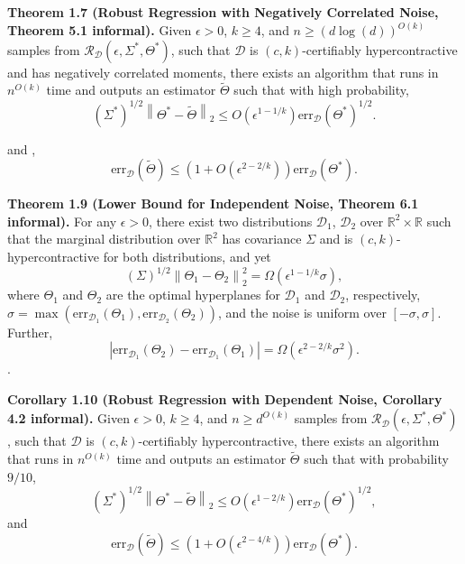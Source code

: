 \documentclass[preprint,11pt]{elsarticle}
\begin{document}
\textbf{Theorem 1.7 (Robust Regression with Negatively Correlated Noise, Theorem 5.1 informal).} 
Given $\epsilon > 0$, $k \geq 4$, and $n \geq (d \log(d))^{O(k)}$ samples from $\mathcal{R}_\mathcal{D}(\epsilon, \Sigma^\ast, \Theta^\ast)$, such that $\mathcal{D}$ is $(c, k)$-certifiably hypercontractive and has negatively correlated moments, there exists an algorithm that runs in $n^{O(k)}$ time and outputs an estimator $\tilde{\Theta}$ such that with high probability,
\[
(\Sigma^\ast)^{1/2} \left\|\Theta^\ast - \tilde{\Theta} \right\|_2 \leq O \left( \epsilon^{1 - 1/k} \right) \text{err}_{\mathcal{D}}(\Theta^\ast)^{1/2}.
\]

and , \\

\[
\text{err}_{\mathcal{D}}(\tilde{\Theta}) \leq \left( 1 + O\left( \epsilon^{2 - 2/k} \right) \right) \text{err}_{\mathcal{D}}(\Theta^\ast).
\]

\textbf{Theorem 1.9 (Lower Bound for Independent Noise, Theorem 6.1 informal).} For any $\epsilon > 0$, there exist two distributions $\mathcal{D}_1$, $\mathcal{D}_2$ over $\mathbb{R}^2 \times \mathbb{R}$ such that the marginal distribution over $\mathbb{R}^2$ has covariance $\Sigma$ and is $(c, k)$-hypercontractive for both distributions, and yet
\[
(\Sigma)^{1/2} \left\| \Theta_1 - \Theta_2 \right\|_2^2 = \Omega \left( \epsilon^{1 - 1/k} \sigma \right),
\]
where $\Theta_1$ and $\Theta_2$ are the optimal hyperplanes for $\mathcal{D}_1$ and $\mathcal{D}_2$, respectively, $\sigma = \max \left( \text{err}_{\mathcal{D}_1}(\Theta_1), \text{err}_{\mathcal{D}_2}(\Theta_2) \right)$, and the noise is uniform over $[-\sigma, \sigma]$. Further,
\[
\left| \text{err}_{\mathcal{D}_1}(\Theta_2) - \text{err}_{\mathcal{D}_1}(\Theta_1) \right| = \Omega \left( \epsilon^{2 - 2/k} \sigma^2 \right).
\]
.

\textbf{Corollary 1.10 (Robust Regression with Dependent Noise, Corollary 4.2 informal).} Given $\epsilon > 0$, $k \geq 4$, and $n \geq d^{O(k)}$ samples from $\mathcal{R}_\mathcal{D}(\epsilon, \Sigma^\ast, \Theta^\ast)$, such that $\mathcal{D}$ is $(c, k)$-certifiably hypercontractive, there exists an algorithm that runs in $n^{O(k)}$ time and outputs an estimator $\tilde{\Theta}$ such that with probability $9/10$,
\[
(\Sigma^\ast)^{1/2} \left\|\Theta^\ast - \tilde{\Theta} \right\|_2 \leq O \left( \epsilon^{1 - 2/k} \right) \text{err}_{\mathcal{D}}(\Theta^\ast)^{1/2},
\]
and
\[
\text{err}_{\mathcal{D}}(\tilde{\Theta}) \leq \left( 1 + O\left( \epsilon^{2 - 4/k} \right) \right) \text{err}_{\mathcal{D}}(\Theta^\ast).
\]
\end{document}

